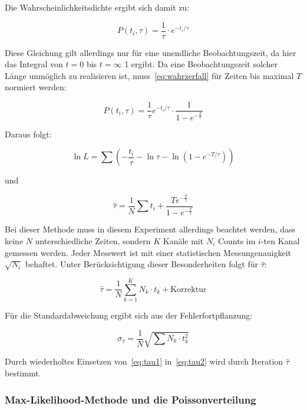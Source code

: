 \documentclass[slug=LM, room=Andreas-Schubert-Bau\,\ K\ 1A, supervisor=Anne-Sophie\ Berthold, coursedate=13.\ 12.\ 2019]{../../Lab_Report_LaTeX/lab_report}
\begin{document}
Die Wahrscheinlichkeitsdichte ergibt sich damit zu:

\begin{equation}\label{eq:wahrzerfall}
 P(t_i,\tau) = \frac{1}{\tau} \cdot e^{-t_i/\tau}
\end{equation}

Diese Gleichung gilt allerdings nur für eine unendliche Beobachtungszeit, da hier das Integral
von \(t = 0\) bis \(t = \infty\) 1 ergibt.
Da eine Beobachtungszeit solcher Länge unmöglich zu realisieren ist, muss~\ref{eq:wahrzerfall}
für Zeiten bis maximal \(T\) normiert werden:

\begin{equation}\label{eq:modzerfall}
 P(t_i,\tau) = \frac{1}{\tau}e^{-t_i/\tau} \cdot \frac{1}{1-e^{-\frac{T}{\tau}}}
\end{equation}

Daraus folgt:

\begin{equation}\label{key}
 \ln L = \sum (-\frac{t_i}{\tau} - \ln\tau - \ln(1-e^{-T/\tau}))
\end{equation}

und

\begin{equation}\label{eq:tau2}
 \hat\tau = \frac{1}{N} \sum t_i + \frac{T e^{-\frac{T}{\tau}}}{1-e^{-\frac{T}{\tau}}}
\end{equation}

Bei dieser Methode muss in diesem Experiment allerdings beachtet werden, dass keine \(N\)
unterschiedliche Zeiten, sondern \(K\) Kanäle mit \(N_i\) Counts im \(i\)-ten Kanal gemessen
werden. Jeder Messwert ist mit einer statistischen Messungenauigkeit \(\sqrt{N_i}\) behaftet.
Unter Berücksichtigung dieser Besonderheiten folgt für \(\hat\tau\):

\begin{equation}\label{eq:tau1}
 \hat\tau = \frac{1}{N} \sum_{k=1}^{K}N_k\cdot t_k + \text{Korrektur}
\end{equation}

Für die Standardabweichung ergibt sich aus der Fehlerfortpflanzung:

\begin{equation}\label{key}
 \sigma_{\hat\tau} = \frac{1}{N} \sqrt{\sum N_k \cdot t_k^2}
\end{equation}

Durch wiederholtes Einsetzen von~\ref{eq:tau1} in~\ref{eq:tau2} wird durch Iteration \(\hat\tau\)
bestimmt.

\subsubsection{Max-Likelihood-Methode und die Poissonverteilung}
\label{sec:likepoisson}
\end{document}
